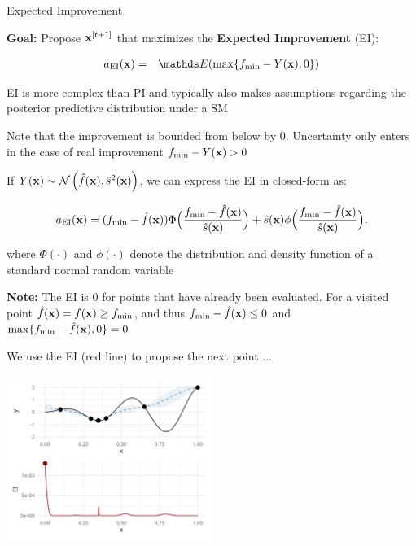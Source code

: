 \documentclass[11pt,compress,t,notes=noshow, xcolor=table]{beamer}
\begin{document}
\begin{vbframe}{Expected Improvement}

\textbf{Goal:} Propose $\mathbf{x}^{[t+1]}$ that maximizes the \textbf{Expected Improvement} (EI): 

\vspace*{-0.5cm}

\begin{eqnarray*}
  a_{\text{EI}}(\xv) &=& \E(\max\{\fmin - Y(\xv), 0\}) \\
\end{eqnarray*} 

\vspace*{-0.5cm}

EI is more complex than PI and typically also makes assumptions regarding the posterior predictive distribution under a SM\\

\vspace{1em}

Note that the improvement is bounded from below by $0$. Uncertainty only enters in the case of real improvement $f_{\min} - Y(\mathbf{x}) > 0$

\framebreak

If $Y(\mathbf{x}) \sim \mathcal{N}\left(\hat{f}(\mathbf{x}), \hat{s}^2(\mathbf{x})\right)$, we can express the EI in closed-form as: 

$$
a_{\text{EI}}(\mathbf{x}) = (f_{\min}-\hat{f}(\mathbf{x})) \Phi \Big(\frac{f_{\min} - \hat{f}(\mathbf{x})}{\hat{s}(\mathbf{x})}\Big) + \hat{s}(\mathbf{x}) \phi\Big(\frac{f_{\min}-\hat{f}(\mathbf{x})}{\hat{s}(\mathbf{x})}\Big), 
$$

where $\Phi(\cdot)$ and $\phi(\cdot)$ denote the distribution and density function of a standard normal random variable

\vfill

\begin{footnotesize}
\textbf{Note:} The EI is $0$ for points that have already been evaluated. For a visited point $\hat{f}(\mathbf{x}) = f(\mathbf{x}) \ge f_{\min}$, and thus $f_{\min} - \hat{f}(\mathbf{x}) \le 0$ and $\max\{f_{\min} - \hat{f}(\mathbf{x}), 0\} = 0$
\end{footnotesize}

\framebreak

We use the EI (red line) to propose the next point ...

\begin{center}
  \includegraphics[width = 0.5\textwidth]{figure_man/bayesian_loop_4.png}
\end{center}


\end{vbframe}
\end{document}
